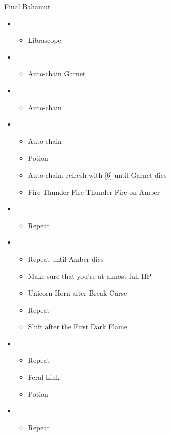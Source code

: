 \begin{battle}{Final Bahamut}
\begin{flushleft}
\begin{itemize}
	\item \sixth
	\begin{itemize}
		\item Librascope
	\end{itemize}
	\item \fifth
	\begin{itemize}
		\item Auto-chain Garnet
	\end{itemize}
	\item \third
	\begin{itemize}
		\item Auto-chain
	\end{itemize}
	\item \fifth
	\begin{itemize}
		\item Auto-chain
		\item Potion
		\item Auto-chain, refresh with [6] until Garnet dies
		\item Fire-Thunder-Fire-Thunder-Fire on Amber
	\end{itemize}
	\item \third
	\begin{itemize}
		\item Repeat
	\end{itemize}
	\item \fifth
	\begin{itemize}
		\item Repeat until Amber dies
		\item Make sure that you're at almost full HP
		\item Unicorn Horn after Break Curse
		\item Repeat
		\item Shift after the First Dark Flame
	\end{itemize}
	\item \second
	\begin{itemize}
		\item Repeat
		\item Feral Link
		\item Potion
	\end{itemize}
	\item \sixth
	\begin{itemize}
		\item Repeat
	\end{itemize}

\end{itemize}
\end{flushleft}
\end{battle}

